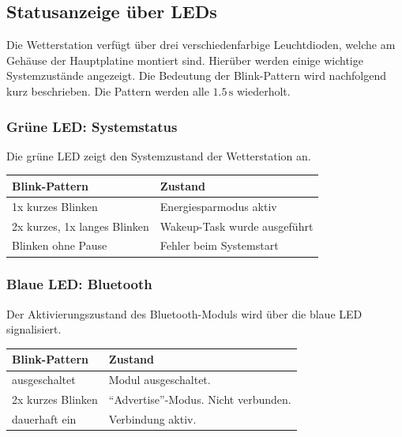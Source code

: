     \subsection{Statusanzeige über LEDs}
        Die Wetterstation verfügt über drei verschiedenfarbige Leuchtdioden, welche am Gehäuse der Hauptplatine montiert sind. Hierüber werden einige wichtige Systemzustände angezeigt. Die Bedeutung der Blink-Pattern wird nachfolgend kurz beschrieben. Die Pattern werden alle $1.5\,\mathrm{s}$ wiederholt.
        
        \subsubsection{Grüne LED: Systemstatus}
        Die grüne LED zeigt den Systemzustand der Wetterstation an. 
        \begin{table}[H]
            \centering
            \begin{tabular}{|l|l|}
                \hline
                \textbf{Blink-Pattern}  & \textbf{Zustand}  \\
                \hline
                1x kurzes Blinken       & Energiesparmodus aktiv \\
                2x kurzes, 1x langes Blinken & Wakeup-Task wurde ausgeführt\\
                Blinken ohne Pause      & Fehler beim Systemstart\\
                \hline
            \end{tabular}
        \end{table}
        
        \subsubsection{Blaue LED: Bluetooth}
        Der Aktivierungszustand des Bluetooth-Moduls wird über die blaue LED signalisiert.
        \begin{table}[H]
            \centering
            \begin{tabular}{|l|l|}
                \hline
                \textbf{Blink-Pattern}  & \textbf{Zustand}  \\
                \hline
                ausgeschaltet           & Modul ausgeschaltet. \\
                2x kurzes Blinken       & ``Advertise''-Modus. Nicht verbunden.\\
                dauerhaft ein           & Verbindung aktiv. \\
                \hline
            \end{tabular}
        \end{table}
        
